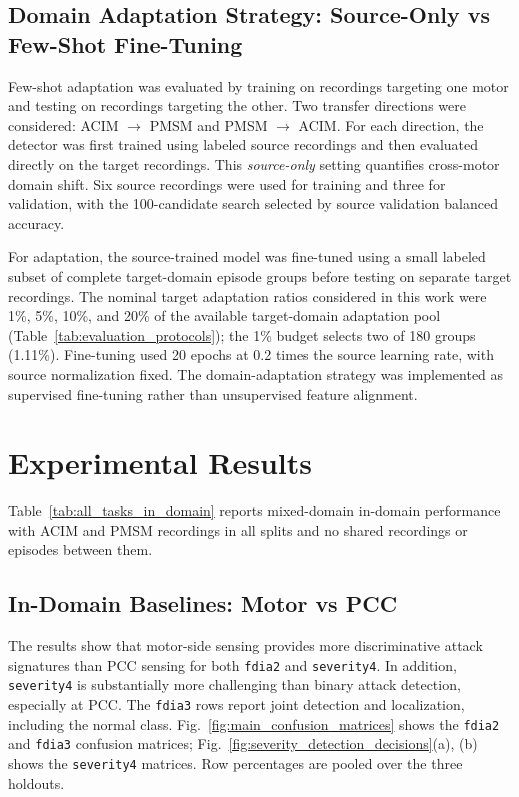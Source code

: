 \documentclass[letterpaper,journal]{IEEEtran}
\begin{document}
\subsection{Domain Adaptation Strategy: Source-Only vs Few-Shot Fine-Tuning}
\label{sec:domain_adaptation}

Few-shot adaptation was evaluated by training on recordings targeting one motor and testing on recordings targeting the other. Two transfer directions were considered: ACIM $\rightarrow$ PMSM and PMSM $\rightarrow$ ACIM. For each direction, the detector was first trained using labeled source recordings and then evaluated directly on the target recordings. This \emph{source-only} setting quantifies cross-motor domain shift. Six source recordings were used for training and three for validation, with the 100-candidate search selected by source validation balanced accuracy.

For adaptation, the source-trained model was fine-tuned using a small labeled subset of complete target-domain episode groups before testing on separate target recordings. The nominal target adaptation ratios considered in this work were 1\%, 5\%, 10\%, and 20\% of the available target-domain adaptation pool (Table~\ref{tab:evaluation_protocols}); the 1\% budget selects two of 180 groups (1.11\%). Fine-tuning used 20 epochs at 0.2 times the source learning rate, with source normalization fixed.
The domain-adaptation strategy was implemented as supervised fine-tuning rather than unsupervised feature alignment.



\section{Experimental Results}
\label{sec:results}

Table~\ref{tab:all_tasks_in_domain} reports mixed-domain in-domain performance with ACIM and PMSM recordings in all splits and no shared recordings or episodes between them.
\subsection{In-Domain Baselines: Motor vs PCC}
\label{sec:in_domain}

The results show that motor-side sensing provides more discriminative attack signatures than PCC sensing for both \texttt{fdia2} and \texttt{severity4}. In addition, \texttt{severity4} is substantially more challenging than binary attack detection, especially at PCC. The \texttt{fdia3} rows report joint detection and localization, including the normal class. Fig.~\ref{fig:main_confusion_matrices} shows the \texttt{fdia2} and \texttt{fdia3} confusion matrices; Fig.~\ref{fig:severity_detection_decisions}(a), (b) shows the \texttt{severity4} matrices. Row percentages are pooled over the three holdouts.
\end{document}
